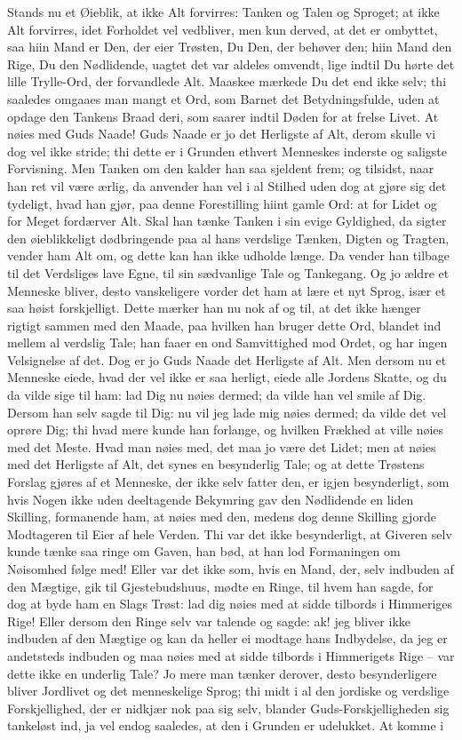 \documentclass[12pt,a4paper]{article}
\begin{document}
Stands nu et Øieblik, at ikke Alt forvirres: Tanken og Talen og Sproget; at ikke Alt forvirres, idet Forholdet vel vedbliver, men kun derved, at det er ombyttet, saa hiin Mand er Den, der eier Trøsten, Du Den, der behøver den; hiin Mand den Rige, Du den Nødlidende, uagtet det var aldeles omvendt, lige indtil Du hørte det lille Trylle-Ord, der forvandlede Alt. Maaskee mærkede Du det end ikke selv; thi saaledes omgaaes man mangt et Ord, som Barnet det Betydningsfulde, uden at opdage den Tankens Braad deri, som saarer indtil Døden for at frelse Livet. At nøies med Guds Naade! Guds Naade er jo det Herligste af Alt, derom skulle vi dog vel ikke stride; thi dette er i Grunden ethvert Menneskes inderste og saligste Forvisning. Men Tanken om den kalder han saa sjeldent frem; og tilsidst, naar han ret vil være ærlig, da anvender han vel i al Stilhed uden dog at gjøre sig det tydeligt, hvad han gjør, paa denne Forestilling hiint gamle Ord: at for Lidet og for Meget fordærver Alt. Skal han tænke Tanken i sin evige Gyldighed, da sigter den øieblikkeligt dødbringende paa al hans verdslige Tænken, Digten og Tragten, vender ham Alt om, og dette kan han ikke udholde længe. Da vender han tilbage til det Verdsliges lave Egne, til sin sædvanlige Tale og Tankegang. Og jo ældre et Menneske bliver, desto vanskeligere vorder det ham at lære et nyt Sprog, især et saa høist forskjelligt. Dette mærker han nu nok af og til, at det ikke hænger rigtigt sammen med den Maade, paa hvilken han bruger dette Ord, blandet ind mellem al verdslig Tale; han faaer en ond Samvittighed mod Ordet, og har ingen Velsignelse af det. Dog er jo Guds Naade det Herligste af Alt. Men dersom nu et Menneske eiede, hvad der vel ikke er saa herligt, eiede alle Jordens Skatte, og du da vilde sige til ham: lad Dig nu nøies dermed; da vilde han vel smile af Dig. Dersom han selv sagde til Dig: nu vil jeg lade mig nøies dermed; da vilde det vel oprøre Dig; thi hvad mere kunde han forlange, og hvilken Frækhed at ville nøies med det Meste. Hvad man nøies med, det maa jo være det Lidet; men at nøies med det Herligste af Alt, det synes en besynderlig Tale; og at dette Trøstens Forslag gjøres af et Menneske, der ikke selv fatter den, er igjen besynderligt, som hvis Nogen ikke uden deeltagende Bekymring gav den Nødlidende en liden Skilling, formanende ham, at nøies med den, medens dog denne Skilling gjorde Modtageren til Eier af hele Verden. Thi var det ikke besynderligt, at Giveren selv kunde tænke saa ringe om Gaven, han bød, at han lod Formaningen om Nøisomhed følge med! Eller var det ikke som, hvis en Mand, der, selv indbuden af den Mægtige, gik til Gjestebudshuus, mødte en Ringe, til hvem han sagde, for dog at byde ham en Slags Trøst: lad dig nøies med at sidde tilbords i Himmeriges Rige! Eller dersom den Ringe selv var talende og sagde: ak! jeg bliver ikke indbuden af den Mægtige og kan da heller ei modtage hans Indbydelse, da jeg er andetsteds indbuden og maa nøies med at sidde tilbords i Himmerigets Rige – var dette ikke en underlig Tale? Jo mere man tænker derover, desto besynderligere bliver Jordlivet og det menneskelige Sprog; thi midt i al den jordiske og verdslige Forskjellighed, der er nidkjær nok paa sig selv, blander Guds-Forskjelligheden sig tankeløst ind, ja vel endog saaledes, at den i Grunden er udelukket. At komme i 
\end{document}
